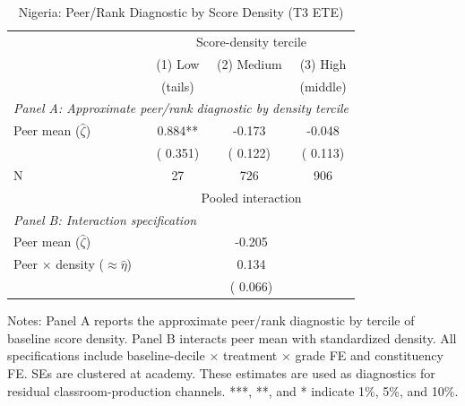 \begin{table}[!htbp]
\centering
\caption{Nigeria: Peer/Rank Diagnostic by Score Density (T3 ETE)}
\label{tab:ng_density_decomp}
\begin{threeparttable}
\begin{tabular}[t]{lccc}
\toprule
 & \multicolumn{3}{c}{Score-density tercile} \\
\cmidrule(l{3pt}r{3pt}){2-4}
 & (1) Low & (2) Medium & (3) High \\
 & (tails) & & (middle) \\
\midrule
\multicolumn{4}{l}{\textit{Panel A: Approximate peer/rank diagnostic by density tercile}} \\
Peer mean ($\hat{\zeta}$) &   0.884** &  -0.173 &  -0.048 \\
 & (  0.351) & (  0.122) & (  0.113) \\
N & 27 & 726 & 906 \\
\addlinespace
\midrule
 & \multicolumn{3}{c}{Pooled interaction} \\
\cmidrule(l{3pt}r{3pt}){2-4}
\multicolumn{4}{l}{\textit{Panel B: Interaction specification}} \\
Peer mean ($\hat{\zeta}$) & \multicolumn{3}{c}{ -0.205} \\
Peer $\times$ density ($\approx \hat{\eta}$) & \multicolumn{3}{c}{  0.134} \\
 & \multicolumn{3}{c}{(  0.066)} \\
\bottomrule
\end{tabular}
\begin{tablenotes}[para]
\item Notes: Panel A reports the approximate peer/rank diagnostic by tercile of baseline score density. Panel B interacts peer mean with standardized density. All specifications include baseline-decile $\times$ treatment $\times$ grade FE and constituency FE. SEs are clustered at academy. These estimates are used as diagnostics for residual classroom-production channels. ***, **, and * indicate 1\%, 5\%, and 10\%.
\end{tablenotes}
\end{threeparttable}
\end{table}
